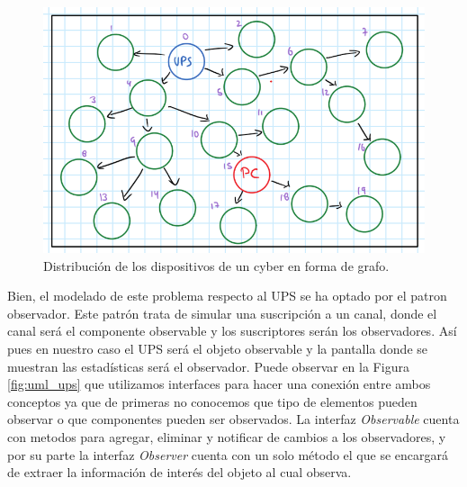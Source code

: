\documentclass[runningheads]{llncs}
\begin{document}
        \begin{figure}[H]
            \centering
            \includegraphics[width=\textwidth]{grafo_cyber}
            \caption{Distribución de los dispositivos de un cyber en forma de grafo.}
            \label{fig:grafo_cyber}
        \end{figure}
        
        Bien, el modelado de este problema respecto al UPS se ha optado por el patron observador. Este patrón trata de simular una suscripción a un canal, donde el canal será el componente observable y los suscriptores serán los observadores. Así pues en nuestro caso el UPS será el objeto observable y la pantalla donde se muestran las estadísticas será el observador. Puede observar en la Figura \ref{fig:uml_ups} que utilizamos interfaces para hacer una conexión entre ambos conceptos ya que de primeras no conocemos que tipo de elementos pueden observar o que componentes pueden ser observados. La interfaz \emph{Observable} cuenta con metodos para agregar, eliminar y notificar de cambios a los observadores, y por su parte la interfaz \emph{Observer} cuenta con un solo método el que se encargará de extraer la información de interés del objeto al cual observa.
        
\end{document}
